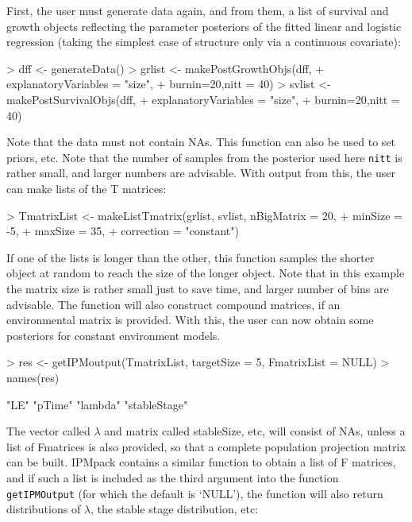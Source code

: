 \documentclass{article}
\begin{document}
First, the user must generate data again, and from them, a list of survival and growth objects reflecting the parameter posteriors of the fitted linear and logistic regression (taking the simplest case of structure only via a continuous covariate):
\begin{Schunk}
\begin{Sinput}
> dff <- generateData()
> grlist <- makePostGrowthObjs(dff, 
+                              explanatoryVariables = "size", 
+                              burnin=20,nitt = 40)
> svlist <- makePostSurvivalObjs(dff, 
+                                explanatoryVariables = "size", 
+                                burnin=20,nitt = 40)
\end{Sinput}
\end{Schunk}
Note that the data must not contain NAs. This function can also be used to set priors, etc. Note that the number of samples from the posterior used here {\tt nitt} is rather small, and larger numbers are advisable. With output from this, the user can make lists of the T matrices:
\begin{Schunk}
\begin{Sinput}
> TmatrixList <- makeListTmatrix(grlist, svlist, nBigMatrix = 20, 
+                                minSize = -5, 
+                                maxSize = 35, 
+                                correction = "constant")
\end{Sinput}
\end{Schunk}
If one of the lists is longer than the other, this function samples the shorter object at random to reach the size of the longer object. Note that in this example the matrix size is rather small just to save time, and larger number of bins are advisable. The function will also construct compound matrices, if an environmental
matrix is provided. With this, the user can now obtain some posteriors for constant environment models. 
\begin{Schunk}
\begin{Sinput}
> res <- getIPMoutput(TmatrixList, targetSize = 5, FmatrixList = NULL)
> names(res)
\end{Sinput}
\begin{Soutput}
[1] "LE"          "pTime"       "lambda"      "stableStage"
\end{Soutput}
\end{Schunk}
The vector called $\lambda$ and matrix called stableSize, etc, will consist of NAs, unless a list of Fmatrices is also provided, so that a complete population projection matrix can be built. IPMpack contains a similar function to obtain a list of F matrices, and if such a list is included as the third argument into the function {\tt getIPMOutput} (for which the default is `NULL'), the function will also return distributions of $\lambda$, the stable stage distribution, etc:  
\end{document}

